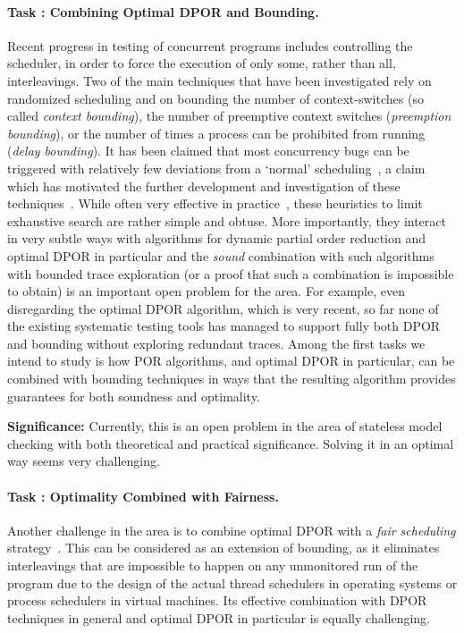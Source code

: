 \documentclass[11pt]{article}
\newcounter{Task}
\newcommand{\task}[1]{\addtocounter{Task}{1}\paragraph{Task \theTask: #1}}
\newcommand{\significance}[1]{\vspace*{-0.5em}%
  \begin{quoting}\noindent\textbf{Significance:} #1\end{quoting}}
\newcommand{\myparagraph}{}
\let\myparagraph=\paragraph
\renewcommand{\paragraph}{\vspace{-3mm}\myparagraph}
\begin{document}
{\task{Combining Optimal DPOR and Bounding.}
Recent progress in testing of concurrent programs includes controlling
the scheduler, in order to force the execution of only some, rather than
all, interleavings. Two of the main techniques that have been investigated
rely on randomized scheduling and on bounding the number of context-switches
(so called \emph{context bounding}), the number of preemptive context
switches (\emph{preemption bounding}), or the number of times a process
can be prohibited from running (\emph{delay bounding}). It has been
claimed that most concurrency bugs can be triggered with relatively
few deviations from a `normal' scheduling~\cite{Randomized@ASPLOS-10},
a claim which has motivated the further development and investigation
of these techniques~\cite{ScheduleBounding@PPoPP-14}.
%
While often very effective in
practice~\cite{BPOR@OOPSLA-13,ScheduleBounding@PPoPP-14}, these heuristics
to limit exhaustive search are rather simple and obtuse.  More importantly,
they interact in very subtle ways with algorithms for dynamic partial order
reduction and optimal DPOR in particular and the \emph{sound} combination
with such algorithms with bounded trace exploration (or a proof that such a
combination is impossible to obtain) is an important open problem for the
area.  For example, even disregarding the optimal DPOR algorithm, which is
very recent, so far none of the existing systematic testing tools has managed
to support fully both DPOR and bounding without exploring redundant traces.
%
Among the first tasks we intend to study is how POR algorithms, and
optimal DPOR in particular, can be combined with bounding techniques
in ways that the resulting algorithm provides guarantees for
both soundness and optimality.

\significance{Currently, this is an open problem in the area of stateless
  model checking with both theoretical and practical significance. Solving
  it in an optimal way seems very challenging.}

\task{Optimality Combined with Fairness.}
Another challenge in the area is to combine optimal DPOR with a
\emph{fair scheduling} strategy~\cite{FairStatelessMC@PLDI-08}. This
can be considered as an extension of bounding, as it eliminates
interleavings that are impossible to happen on any unmonitored run of
the program due to the design of the actual thread schedulers in
operating systems or process schedulers in virtual machines.  Its
effective combination with DPOR techniques in general and optimal
DPOR in particular is equally challenging.

}
\end{document}
